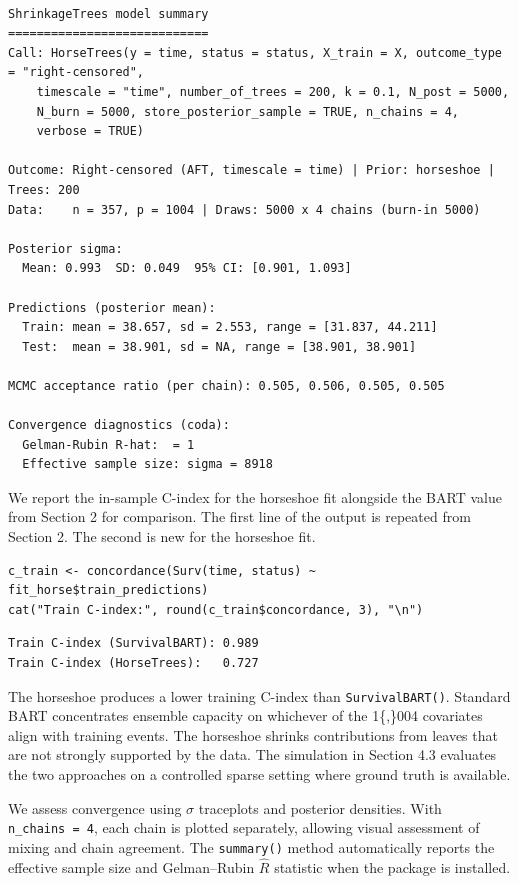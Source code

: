 \begin{verbatim}

ShrinkageTrees model summary
============================
Call: HorseTrees(y = time, status = status, X_train = X, outcome_type = "right-censored", 
    timescale = "time", number_of_trees = 200, k = 0.1, N_post = 5000, 
    N_burn = 5000, store_posterior_sample = TRUE, n_chains = 4, 
    verbose = TRUE)

Outcome: Right-censored (AFT, timescale = time) | Prior: horseshoe | Trees: 200
Data:    n = 357, p = 1004 | Draws: 5000 x 4 chains (burn-in 5000)

Posterior sigma:
  Mean: 0.993  SD: 0.049  95% CI: [0.901, 1.093]

Predictions (posterior mean):
  Train: mean = 38.657, sd = 2.553, range = [31.837, 44.211]
  Test:  mean = 38.901, sd = NA, range = [38.901, 38.901]

MCMC acceptance ratio (per chain): 0.505, 0.506, 0.505, 0.505

Convergence diagnostics (coda):
  Gelman-Rubin R-hat:  = 1
  Effective sample size: sigma = 8918
\end{verbatim}

We report the in-sample C-index for the horseshoe fit alongside the BART value from Section 2 for comparison. The first line of the output is repeated from Section 2. The second is new for the horseshoe fit.

\begin{verbatim}
c_train <- concordance(Surv(time, status) ~ fit_horse$train_predictions)
cat("Train C-index:", round(c_train$concordance, 3), "\n")
\end{verbatim}

\begin{verbatim}
Train C-index (SurvivalBART): 0.989
Train C-index (HorseTrees):   0.727
\end{verbatim}

The horseshoe produces a lower training C-index than \texttt{SurvivalBART()}. Standard BART concentrates ensemble capacity on whichever of the 1\{,\}004 covariates align with training events. The horseshoe shrinks contributions from leaves that are not strongly supported by the data. The simulation in Section 4.3 evaluates the two approaches on a controlled sparse setting where ground truth is available.

We assess convergence using \(\sigma\) traceplots and posterior densities. With \texttt{n\_chains\ =\ 4}, each chain is plotted separately, allowing visual assessment of mixing and chain agreement. The \texttt{summary()} method automatically reports the effective sample size and Gelman--Rubin \(\hat{R}\) statistic when the  package is installed.

